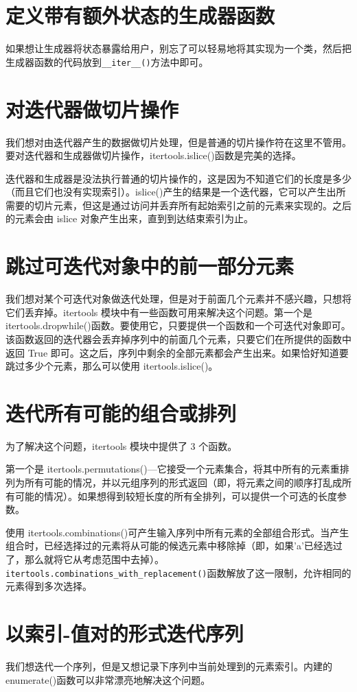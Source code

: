 \section{定义带有额外状态的生成器函数}
如果想让生成器将状态暴露给用户，别忘了可以轻易地将其实现为一个类，然后把生成器函数的代码放到\verb|__iter__()|方法中即可。
\section{对迭代器做切片操作}
我们想对由迭代器产生的数据做切片处理，但是普通的切片操作符在这里不管用。要对迭代器和生成器做切片操作，itertools.islice()函数是完美的选择。

迭代器和生成器是没法执行普通的切片操作的，这是因为不知道它们的长度是多少（而且它们也没有实现索引）。islice()产生的结果是一个迭代器，它可以产生出所需要的切片元素，但这是通过访问并丢弃所有起始索引之前的元素来实现的。之后的元素会由 islice 对象产生出来，直到到达结束索引为止。
\section{跳过可迭代对象中的前一部分元素}
我们想对某个可迭代对象做迭代处理，但是对于前面几个元素并不感兴趣，只想将它们丢弃掉。itertools 模块中有一些函数可用来解决这个问题。第一个是 itertools.dropwhile()函数。要使用它，只要提供一个函数和一个可迭代对象即可。该函数返回的迭代器会丢弃掉序列中的前面几个元素，只要它们在所提供的函数中返回 True 即可。这之后，序列中剩余的全部元素都会产生出来。如果恰好知道要跳过多少个元素，那么可以使用 itertools.islice()。
\section{迭代所有可能的组合或排列}
为了解决这个问题，itertools 模块中提供了 3 个函数。

第一个是 itertools.permutations()—它接受一个元素集合，将其中所有的元素重排列为所有可能的情况，并以元组序列的形式返回（即，将元素之间的顺序打乱成所有可能的情况）。如果想得到较短长度的所有全排列，可以提供一个可选的长度参数。

使用 itertools.combinations()可产生输入序列中所有元素的全部组合形式。当产生组合时，已经选择过的元素将从可能的候选元素中移除掉（即，如果'a'已经选过了，那么就将它从考虑范围中去掉）。\verb|itertools.combinations_with_replacement()|函数解放了这一限制，允许相同的元素得到多次选择。
\section{以索引-值对的形式迭代序列}
我们想迭代一个序列，但是又想记录下序列中当前处理到的元素索引。内建的 enumerate()函数可以非常漂亮地解决这个问题。


